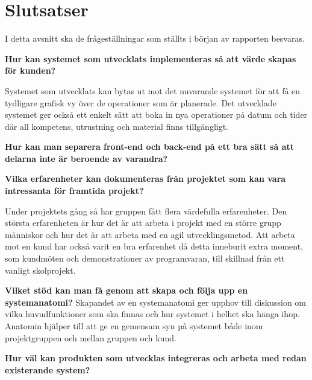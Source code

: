 \chapter{Slutsatser}
I detta avsnitt ska de frågeställningar som ställts i början av rapporten besvaras.

\textbf{Hur kan systemet som utvecklats implementeras så att värde skapas för kunden?}

Systemet som utvecklats kan bytas ut mot det nuvarande systemet för att få en tydligare grafisk vy över de operationer som är planerade. Det utvecklade systemet ger också ett enkelt sätt att boka in nya operationer på datum och tider där all kompetens, utrustning och material finns tillgängligt.

\textbf{Hur kan man separera front-end och back-end på ett bra sätt så att delarna inte är beroende av varandra?}

\textbf{Vilka erfarenheter kan dokumenteras från projektet som kan vara intressanta för framtida projekt?}

Under projektets gång så har gruppen fått flera värdefulla erfarenheter. Den största erfarenheten är hur det är att arbeta i projekt med en större grupp människor och hur det är att arbeta med en agil utvecklingsmetod. Att arbeta mot en kund har också varit en bra erfarenhet då detta inneburit extra moment, som kundmöten och demonstrationer av programvaran, till skillnad från ett vanligt skolprojekt.

\textbf{Vilket stöd kan man få genom att skapa och följa upp en systemanatomi?}
Skapandet av en systemanatomi ger upphov till diskussion om vilka huvudfunktioner som ska finnas och hur systemet i helhet ska hänga ihop. Anatomin hjälper till att ge en gemensam syn på systemet både inom projektgruppen och mellan gruppen och kund.   

\textbf{Hur väl kan produkten som utvecklas integreras och arbeta med redan existerande system?}